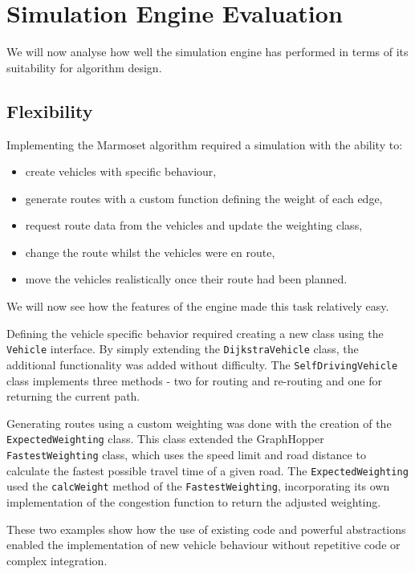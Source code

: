 \documentclass[ %
                    author={Alexander Hill},
                supervisor={Dr. Benjamin Sach},
                    degree={MEng},
                     title={MARMOSET},
                  subtitle={Multi-Agent Route Management using Online Simulation for Efficient Transportation},
                      type={research},
                      year={2016} ]{dissertation}
\begin{document}
\section{Simulation Engine Evaluation}\label{sec:simev}

We will now analyse how well the simulation engine has performed in terms
of its suitability for algorithm design.

\subsection{Flexibility}

Implementing the Marmoset algorithm required a simulation with the ability to:

\begin{itemize}
    \item create vehicles with specific behaviour,
    \item generate routes with a custom function defining the weight of each
        edge,
    \item request route data from the vehicles and update the weighting class,
    \item change the route whilst the vehicles were en route,
    \item move the vehicles realistically once their route had been planned.
\end{itemize}

We will now see how the features of the engine made this task relatively easy.

Defining the vehicle specific behavior required creating a new class using the
\texttt{Vehicle} interface. By simply extending the \texttt{DijkstraVehicle}
class, the additional functionality was added without difficulty. The
\texttt{SelfDrivingVehicle} class implements three methods - two for routing and
re-routing and one for returning the current path.

Generating routes using a custom weighting was done with the creation of the
\texttt{ExpectedWeighting} class. This class extended the GraphHopper
\texttt{FastestWeighting} class, which uses the speed limit and road distance to
calculate the fastest possible travel time of a given road. The
\texttt{ExpectedWeighting} used the \texttt{calcWeight} method of the
\texttt{FastestWeighting}, incorporating its own implementation of the
congestion function to return the adjusted weighting.

These two examples show how the use of existing code and powerful abstractions
enabled the implementation of new vehicle behaviour without repetitive code or
complex integration.
\end{document}
